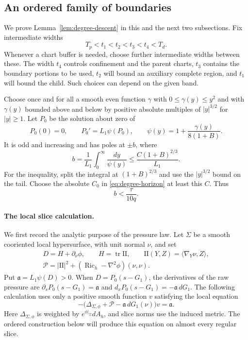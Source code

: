 \subsection{An ordered family of boundaries}

We prove Lemma~\ref{lem:degree-descent} in this and the next two
subsections.  Fix intermediate widths
\begin{equation}\label{eq:degree-intermediate-widths}
              T_p<t_1<t_2<t_3<t_4<T_d.
\end{equation}
Whenever a chart buffer is needed, choose further intermediate widths
between these.  The width $t_4$ controls confinement and the parent
charts, $t_3$ contains the boundary portions to be used, $t_2$ will bound
an auxiliary complete region, and $t_1$ will bound the child.  Such
choices can depend on the given band.

Choose once and for all a smooth even function $\gamma$ with
$0\le\gamma(y)\le y^2$ and with $\gamma(y)$ bounded above and below by
positive absolute multiples of $|y|^{3/2}$ for $|y|\ge1$.  Let $P_0$ be the
solution about zero of
\begin{equation}\label{eq:degree-pressure}
 P_0(0)=0,\qquad P_0'=L_1\psi(P_0),\qquad
       \psi(y)=1+\frac{\gamma(y)}{8(1+B)}.
\end{equation}
It is odd and increasing and has poles at $\pm b$, where
\[
 b=\frac1{L_1}\int_0^\infty\frac{dy}{\psi(y)}
       \le\frac{C(1+B)^{2/3}}{L_1}.
\]
For the inequality, split the integral at $(1+B)^{2/3}$ and use the
$|y|^{3/2}$ bound on the tail.  Choose the absolute $C_0$ in
\eqref{eq:degree-horizon} at least this $C$.  Thus
\begin{equation}\label{eq:degree-pole-width}
                         b<\frac{\tau}{10q}.
\end{equation}

\paragraph{The local slice calculation.}
We first record the analytic purpose of the pressure law.  Let $\Sigma$
be a smooth cooriented local hypersurface, with unit normal $\nu$, and set
\[
 \begin{gathered}
 D=H+\partial_\nu\phi,\qquad
 H=\operatorname{tr}\mathrm{II},\qquad
 \mathrm{II}(Y,Z)=\langle\nabla_Y\nu,Z\rangle,\\
 \mathcal P=|\mathrm{II}|^2+
             (\operatorname{Ric}_h-\nabla^2\phi)(\nu,\nu).
 \end{gathered}
\]
Put $\mathfrak a=L_1\psi(D)>0$.  When $D=P_0(s-G_1)$, the derivatives
of the raw pressure are $\partial_sP_0(s-G_1)=\mathfrak a$ and
$d_xP_0(s-G_1)=-\mathfrak a\,dG_1$.  The following calculation uses
only a positive smooth function $v$ satisfying the local equation
\begin{equation}\label{eq:degree-local-lapse}
 -\bigl(\Delta_{\Sigma,\phi}+\mathcal P
                 -\mathfrak a\,dG_1(\nu)\bigr)v=\mathfrak a.
\end{equation}
Here $\Delta_{\Sigma,\phi}$ is weighted by
$e^{\phi|_\Sigma}dA_h$, and slice norms use the induced metric.  The
ordered construction below will produce this equation on almost every
regular slice.

